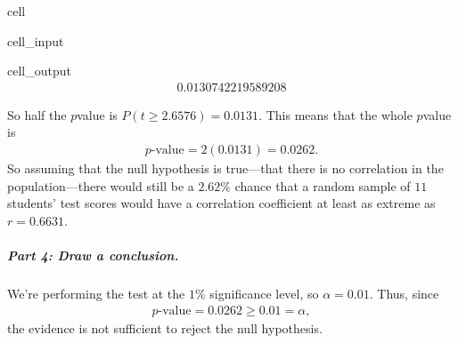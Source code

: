 \documentclass[letterpaper,10pt,english]{jupyterBook}
\begin{document}
\begin{sphinxuseclass}{cell}\begin{sphinxVerbatimInput}

\begin{sphinxuseclass}{cell_input}
\begin{sphinxVerbatim}[commandchars=\\\{\}]
\end{sphinxVerbatim}

\end{sphinxuseclass}\end{sphinxVerbatimInput}
\begin{sphinxVerbatimOutput}

\begin{sphinxuseclass}{cell_output}\begin{equation*}
\begin{split}0.0130742219589208\end{split}
\end{equation*}
\end{sphinxuseclass}\end{sphinxVerbatimOutput}

\end{sphinxuseclass}
\sphinxAtStartPar
So half the \(p\)\sphinxhyphen{}value is \(P(t \geq 2.6576) = 0.0131\). This means that the whole \(p\)\sphinxhyphen{}value is
\begin{equation*}
\begin{split}p\text{-value} = 2(0.0131) = 0.0262. \end{split}
\end{equation*}
\sphinxAtStartPar
So assuming that the null hypothesis is true—that there is no correlation in the population—there would still be a \(2.62\%\) chance that a random sample of \(11\) students’ test scores would have a correlation coefficient at least as extreme as \(r = 0.6631\).


\subparagraph{Part 4: Draw a conclusion.}
\label{\detokenize{Ch8 Correlation and Linear Regression/8.4 The Correlation Coefficient:part-4-draw-a-conclusion}}
\sphinxAtStartPar
We’re performing the test at the \(1\%\) significance level, so \(\alpha = 0.01\). Thus, since
\begin{equation*}
\begin{split}p\text{-value} = 0.0262 \geq 0.01 = \alpha, \end{split}
\end{equation*}
\sphinxAtStartPar
the evidence is not sufficient to reject the null hypothesis.
\end{document}
